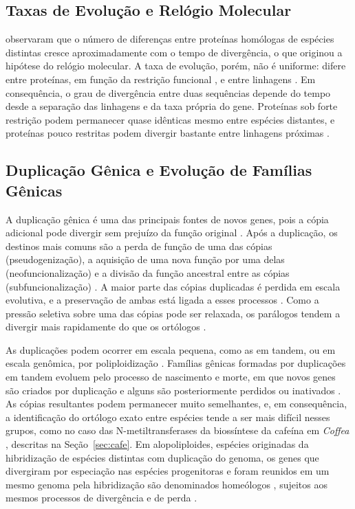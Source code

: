 \subsection{Taxas de Evolução e Relógio Molecular}

 observaram que o número de diferenças entre proteínas homólogas de espécies distintas cresce aproximadamente com o tempo de divergência, o que originou a hipótese do relógio molecular. A taxa de evolução, porém, não é uniforme: difere entre proteínas, em função da restrição funcional \cite{KimuraOhta1974}, e entre linhagens \cite{GraurLi2000}. Em consequência, o grau de divergência entre duas sequências depende do tempo desde a separação das linhagens e da taxa própria do gene. Proteínas sob forte restrição podem permanecer quase idênticas mesmo entre espécies distantes, e proteínas pouco restritas podem divergir bastante entre linhagens próximas \cite{KimuraOhta1974}.

\subsection{Duplicação Gênica e Evolução de Famílias Gênicas}
\label{subsec:duplicacao}

A duplicação gênica é uma das principais fontes de novos genes, pois a cópia adicional pode divergir sem prejuízo da função original \cite{Ohno1970}. Após a duplicação, os destinos mais comuns são a perda de função de uma das cópias (pseudogenização), a aquisição de uma nova função por uma delas (neofuncionalização) e a divisão da função ancestral entre as cópias (subfuncionalização) \cite{Force1999}. A maior parte das cópias duplicadas é perdida em escala evolutiva, e a preservação de ambas está ligada a esses processos \cite{Lynch2000}. Como a pressão seletiva sobre uma das cópias pode ser relaxada, os parálogos tendem a divergir mais rapidamente do que os ortólogos \cite{Zhang2003}.

As duplicações podem ocorrer em escala pequena, como as em tandem, ou em escala genômica, por poliploidização \cite{Zhang2003}. Famílias gênicas formadas por duplicações em tandem evoluem pelo processo de nascimento e morte, em que novos genes são criados por duplicação e alguns são posteriormente perdidos ou inativados \cite{NeiRooney2005}. As cópias resultantes podem permanecer muito semelhantes, e, em consequência, a identificação do ortólogo exato entre espécies tende a ser mais difícil nesses grupos, como no caso das N-metiltransferases da biossíntese da cafeína em \textit{Coffea} \cite{Denoeud2014}, descritas na Seção~\ref{sec:cafe}. Em alopoliploides, espécies originadas da hibridização de espécies distintas com duplicação do genoma, os genes que divergiram por especiação nas espécies progenitoras e foram reunidos em um mesmo genoma pela hibridização são denominados homeólogos \cite{Glover2016}, sujeitos aos mesmos processos de divergência e de perda \cite{Zhang2003}.


